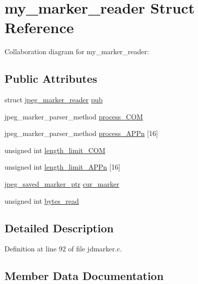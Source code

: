 \hypertarget{structmy__marker__reader}{}\section{my\+\_\+marker\+\_\+reader Struct Reference}
\label{structmy__marker__reader}


Collaboration diagram for my\+\_\+marker\+\_\+reader\+:
\subsection*{Public Attributes}
\begin{DoxyCompactItemize}
\item 
struct \mbox{\hyperlink{structjpeg__marker__reader}{jpeg\+\_\+marker\+\_\+reader}} \mbox{\hyperlink{structmy__marker__reader_ac0d8a24c85575d304ef4383e8f6ca5fc}{pub}}
\item 
jpeg\+\_\+marker\+\_\+parser\+\_\+method \mbox{\hyperlink{structmy__marker__reader_a5e10e69e117d23840f04d54e7a3cdde5}{process\+\_\+\+C\+OM}}
\item 
jpeg\+\_\+marker\+\_\+parser\+\_\+method \mbox{\hyperlink{structmy__marker__reader_a3a466da71db30199ab019a03960013cc}{process\+\_\+\+A\+P\+Pn}} \mbox{[}16\mbox{]}
\item 
unsigned int \mbox{\hyperlink{structmy__marker__reader_aa17938db027aceb539d880b78841826e}{length\+\_\+limit\+\_\+\+C\+OM}}
\item 
unsigned int \mbox{\hyperlink{structmy__marker__reader_a029e9f21bc02a21c1a26d3c0d7158098}{length\+\_\+limit\+\_\+\+A\+P\+Pn}} \mbox{[}16\mbox{]}
\item 
\mbox{\hyperlink{jpeglib_8h_a2efb5205b3e81589f2dc133f1a412bb0}{jpeg\+\_\+saved\+\_\+marker\+\_\+ptr}} \mbox{\hyperlink{structmy__marker__reader_a861ef3029e1690b4345a8ceb3975e8df}{cur\+\_\+marker}}
\item 
unsigned int \mbox{\hyperlink{structmy__marker__reader_ada1054ee3408bbfcacdddb27af8d9754}{bytes\+\_\+read}}
\end{DoxyCompactItemize}


\subsection{Detailed Description}


Definition at line 92 of file jdmarker.\+c.



\subsection{Member Data Documentation}
\mbox{\label{structmy__marker__reader_ada1054ee3408bbfcacdddb27af8d9754}} 
